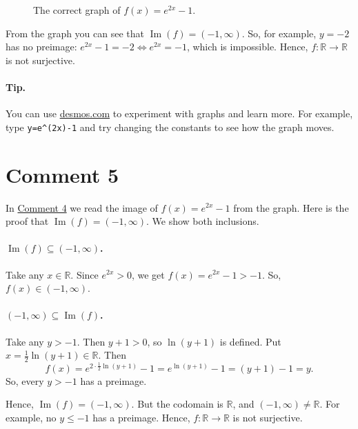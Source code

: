 \documentclass{article}
\theoremstyle{definition}
\begin{document}
\begin{figure}[H]
    \centering
    \caption{The correct graph of $f(x)=e^{2x}-1$.}
\end{figure}

From the graph you can see that $\operatorname{Im}(f)=(-1,\infty)$. So, for example, $y=-2$ has no preimage: $e^{2x}-1=-2 \iff e^{2x}=-1$, which is impossible. Hence, $f:\mathbb{R}\to\mathbb{R}$ is not surjective.

\paragraph{Tip.} You can use \href{https://www.desmos.com/calculator}{desmos.com} to experiment with graphs and learn more. For example, type \texttt{y=e\^{}(2x)-1} and try changing the constants to see how the graph moves.

\section{Comment 5}\label{Comment5}
In \hyperref[Comment4]{Comment 4} we read the image of $f(x)=e^{2x}-1$ from the graph. Here is the proof that $\operatorname{Im}(f)=(-1,\infty)$. We show both inclusions.

\paragraph{$\operatorname{Im}(f)\subseteq(-1,\infty)$.} Take any $x\in\mathbb{R}$. Since $e^{2x}>0$, we get $f(x)=e^{2x}-1>-1$. So, $f(x)\in(-1,\infty)$.

\paragraph{$(-1,\infty)\subseteq\operatorname{Im}(f)$.} Take any $y>-1$. Then $y+1>0$, so $\ln(y+1)$ is defined. Put $x=\frac{1}{2}\ln(y+1)\in\mathbb{R}$. Then
\[
f(x)=e^{2\cdot\frac{1}{2}\ln(y+1)}-1=e^{\ln(y+1)}-1=(y+1)-1=y.
\]
So, every $y>-1$ has a preimage.

Hence, $\operatorname{Im}(f)=(-1,\infty)$. But the codomain is $\mathbb{R}$, and $(-1,\infty)\neq\mathbb{R}$. For example, no $y\le -1$ has a preimage. Hence, $f:\mathbb{R}\to\mathbb{R}$ is not surjective.
\end{document}
